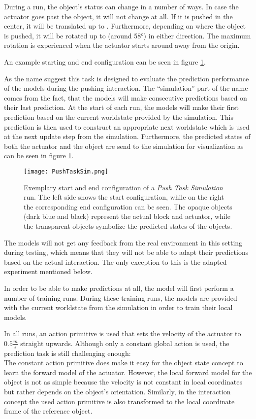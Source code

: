 During a run, the object's status can change in a number of ways. In case the actuator goes past the object, it will not change at all. If it is pushed in the center, it will be translated up to . Furthermore, depending on where the object is pushed, it will be rotated up to  (around 58°) in either direction. %
The maximum rotation is experienced when the actuator starts around  away from the origin.

An example starting and end configuration can be seen in figure \ref{fig:pushTaskSim}. 

As the name suggest this task is designed to evaluate the prediction performance of the models during the pushing interaction. The \enquote{simulation} part of the name comes from the fact, that the models will make consecutive predictions based on their last prediction. At the start of each run, the models will make their first prediction based on the current worldstate provided by the simulation. This prediction is then used to construct an appropriate next worldstate which is used at the next update step from the simulation.
Furthermore, the predicted states of both the actuator and the object are send to the simulation for visualization as can be seen in figure \ref{fig:pushTaskSim}.

\begin{figure}
	\centering
	\texttt{[image: PushTaskSim.png]}
	\caption{Exemplary start and end configuration of a \textit{Push Task Simulation} run. The left side shows the start configuration, while on the right the corresponding end configuration can be seen.
		The opaque objects (dark blue and black) represent the actual block and actuator, while the transparent objects symbolize the predicted states of the objects.}
	\label{fig:pushTaskSim}
\end{figure}

The models will not get any feedback from the real environment in this setting during testing, which means that they will not be able to adapt their predictions based on the actual interaction. The only exception to this is the adapted experiment mentioned below.

In order to be able to make predictions at all, the model will first perform a number of training runs. During these training runs, the models are provided with the current worldstate from the simulation in order to train their local models.

In all runs, an action primitive is used that sets the velocity of the actuator to $0.5\frac{m}{s}$ straight upwards. Although only a constant global action is used, the prediction task is still challenging enough: \\
The constant action primitive does make it easy for the object state concept to learn the forward model of the actuator. However, the local forward model for the object is not as simple because the velocity is not constant in local coordinates but rather depends on the object's orientation. 
Similarly, in the interaction concept the used action primitive is also transformed to the local coordinate frame of the reference object.

